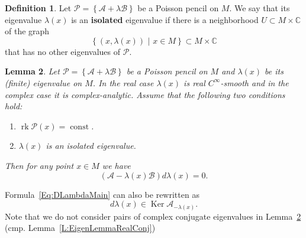 \documentclass[12pt]{article}
\newtheorem{lemma}{Lemma}[section]
\theoremstyle{definition}
\newtheorem{definition}[lemma]{Definition}
\begin{document}
\begin{definition} Let $\mathcal{P} = \left\{\mathcal{A} + \lambda \mathcal{B} \right\}$ be a Poisson pencil on $M$. We say that its eigenvalue $\lambda(x)$ is an \textbf{isolated} eigenvalue if there is a neighborhood $U \subset M \times \mathbb{C}$ of the graph \begin{equation} \label{Eq:Graph} \left\{(x, \lambda(x)) \,\, \bigr| \,\, x \in M\right\} \subset M \times \mathbb{C} \end{equation} that has no other eigenvalues of $\mathcal{P}$.  \end{definition}


\begin{lemma} \label{L:EigenLemma} Let $\mathcal{P} = \left\{\mathcal{A} + \lambda \mathcal{B} \right\}$ be a Poisson pencil on $M$ and $\lambda(x)$ be its (finite) eigenvalue on $M$. In the real case $\lambda(x)$ is real $C^{\infty}$-smooth and in the complex case it is complex-analytic. Assume that the following two conditions hold:

\begin{enumerate}

\item  $\operatorname{rk} \mathcal{P}(x) = \operatorname{const}$. 

\item $\lambda(x)$ is an isolated eigenvalue. 

\end{enumerate}

Then for any point $x \in M$ we have\begin{equation} \label{Eq:DLambdaMain} (\mathcal{A} - \lambda(x)\mathcal{B})d\lambda(x) = 0. \end{equation}
\end{lemma}

Formula~\eqref{Eq:DLambdaMain} can also be rewritten as \[ d \lambda(x) \in \operatorname{Ker} \mathcal{A}_{-\lambda(x)}.\] Note that we do not consider pairs of complex conjugate eigenvalues in Lemma~\ref{L:EigenLemma} (cmp. Lemma~\ref{L:EigenLemmaRealConj})
\end{document}
